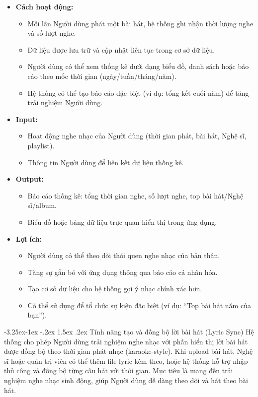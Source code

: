 \documentclass[a4paper]{article}
\makeatletter
\newcommand{\cach}{\hspace*{1.5em}\ignorespaces}
\newcounter {subsubsubsection}[subsubsection]
\newcommand\subsubsubsection{\@startsection{subsubsubsection}{4}{\z@}%
                                     {-3.25ex\@plus -1ex \@minus -.2ex}%
                                     {1.5ex \@plus .2ex}%
                                     {\normalfont\normalsize\bfseries}}
\makeatother
\begin{document}
\begin{itemize}
    \item \textbf{Cách hoạt động:}
    \begin{itemize}
        \item Mỗi lần Người dùng phát một bài hát, hệ thống ghi nhận thời lượng nghe và số lượt nghe.
        \item Dữ liệu được lưu trữ và cập nhật liên tục trong cơ sở dữ liệu.
        \item Người dùng có thể xem thống kê dưới dạng biểu đồ, danh sách hoặc báo cáo theo mốc thời gian (ngày/tuần/tháng/năm).
        \item Hệ thống có thể tạo báo cáo đặc biệt (ví dụ: tổng kết cuối năm) để tăng trải nghiệm Người dùng.
    \end{itemize}

    \item \textbf{Input:}
    \begin{itemize}
        \item Hoạt động nghe nhạc của Người dùng (thời gian phát, bài hát, Nghệ sĩ, playlist).
        \item Thông tin Người dùng để liên kết dữ liệu thống kê.
    \end{itemize}

    \item \textbf{Output:}
    \begin{itemize}
        \item Báo cáo thống kê: tổng thời gian nghe, số lượt nghe, top bài hát/Nghệ sĩ/album.
        \item Biểu đồ hoặc bảng dữ liệu trực quan hiển thị trong ứng dụng.
    \end{itemize}


    \item \textbf{Lợi ích:}
    \begin{itemize}
        \item Người dùng có thể theo dõi thói quen nghe nhạc của bản thân.
        \item Tăng sự gắn bó với ứng dụng thông qua báo cáo cá nhân hóa.
        \item Tạo cơ sở dữ liệu cho hệ thống gợi ý nhạc chính xác hơn.
        \item Có thể sử dụng để tổ chức sự kiện đặc biệt (ví dụ: “Top bài hát năm của bạn”).
    \end{itemize}
\end{itemize}
\subsubsubsection{Tính năng tạo và đồng bộ lời bài hát (Lyric Sync)}  
\cach Hệ thống cho phép Người dùng trải nghiệm nghe nhạc với phần hiển thị lời bài hát được đồng bộ theo thời gian phát nhạc (karaoke-style).  
Khi upload bài hát, Nghệ sĩ hoặc quản trị viên có thể thêm file lyric kèm theo, hoặc hệ thống hỗ trợ nhập thủ công và đồng bộ từng câu hát với thời gian.  
Mục tiêu là mang đến trải nghiệm nghe nhạc sinh động, giúp Người dùng dễ dàng theo dõi và hát theo bài hát.  
\end{document}
